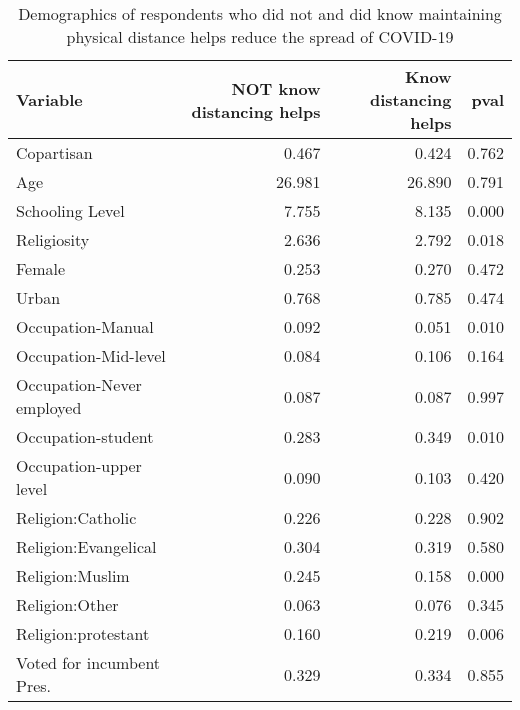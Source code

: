 \begin{table}[ht]
\centering
\caption{Demographics of respondents who did not and did know maintaining physical distance helps reduce the spread of COVID-19} 
\label{tab:notknowdist_dems}
\begin{tabular}{lrrr}
  \hline
Variable & NOT know distancing helps & Know distancing helps & pval \\ 
  \hline
Copartisan & 0.467 & 0.424 & 0.762 \\ 
  Age & 26.981 & 26.890 & 0.791 \\ 
  Schooling Level & 7.755 & 8.135 & 0.000 \\ 
  Religiosity & 2.636 & 2.792 & 0.018 \\ 
  Female & 0.253 & 0.270 & 0.472 \\ 
  Urban & 0.768 & 0.785 & 0.474 \\ 
  Occupation-Manual & 0.092 & 0.051 & 0.010 \\ 
  Occupation-Mid-level & 0.084 & 0.106 & 0.164 \\ 
  Occupation-Never employed & 0.087 & 0.087 & 0.997 \\ 
  Occupation-student & 0.283 & 0.349 & 0.010 \\ 
  Occupation-upper level & 0.090 & 0.103 & 0.420 \\ 
  Religion:Catholic & 0.226 & 0.228 & 0.902 \\ 
  Religion:Evangelical & 0.304 & 0.319 & 0.580 \\ 
  Religion:Muslim & 0.245 & 0.158 & 0.000 \\ 
  Religion:Other & 0.063 & 0.076 & 0.345 \\ 
  Religion:protestant & 0.160 & 0.219 & 0.006 \\ 
  Voted for incumbent Pres. & 0.329 & 0.334 & 0.855 \\ 
   \hline
\end{tabular}
\end{table}


